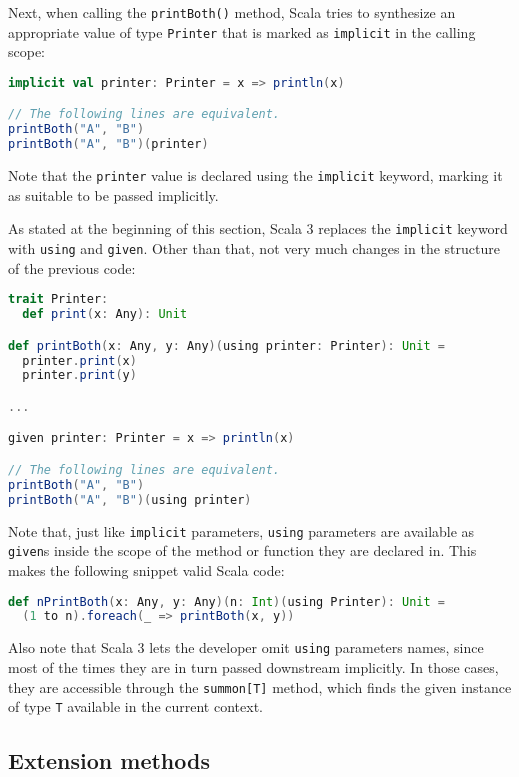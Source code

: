 Next, when calling the \texttt{printBoth()} method, Scala tries to synthesize an appropriate value of type \texttt{Printer} that is marked as \texttt{implicit} in the calling scope:
%
\begin{lstlisting}[frame=single, language=scala]
implicit val printer: Printer = x => println(x)

// The following lines are equivalent.
printBoth("A", "B")
printBoth("A", "B")(printer)
\end{lstlisting}
%
Note that the \texttt{printer} value is declared using the \texttt{implicit} keyword, marking it as suitable to be passed implicitly.

As stated at the beginning of this section, Scala 3 replaces the \texttt{implicit} keyword with \texttt{using} and \texttt{given}.
%
Other than that, not very much changes in the structure of the previous code:
%
\begin{lstlisting}[frame=single, language=scala]
trait Printer:
  def print(x: Any): Unit

def printBoth(x: Any, y: Any)(using printer: Printer): Unit =
  printer.print(x)
  printer.print(y)

...

given printer: Printer = x => println(x)

// The following lines are equivalent.
printBoth("A", "B")
printBoth("A", "B")(using printer)
\end{lstlisting}

Note that, just like \texttt{implicit} parameters, \texttt{using} parameters are available as \texttt{given}s inside the scope of the method or function they are declared in.
%
This makes the following snippet valid Scala code:
%
\begin{lstlisting}[frame=single, language=scala]
def nPrintBoth(x: Any, y: Any)(n: Int)(using Printer): Unit =
  (1 to n).foreach(_ => printBoth(x, y))
\end{lstlisting}
%
Also note that Scala 3 lets the developer omit \texttt{using} parameters names, since most of the times they are in turn passed downstream implicitly.
%
In those cases, they are accessible through the \texttt{summon[T]} method, which finds the given instance of type \texttt{T} available in the current context.

\subsection{Extension methods}
\label{sec:extension-methods}


